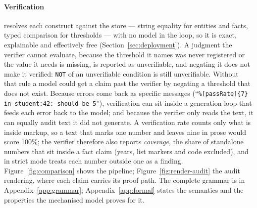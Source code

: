 \documentclass[11pt,a4paper]{article}
\begin{document}
\paragraph{Verification} resolves each construct against the store --- string equality for entities and facts, typed comparison for thresholds --- with no model in the loop, so it is exact, explainable and effectively free (Section~\ref{sec:deployment}). A judgment the verifier cannot evaluate, because the threshold it names was never registered or the value it needs is missing, is reported as unverifiable, and negating it does not make it verified: \texttt{NOT} of an unverifiable condition is still unverifiable. Without that rule a model could get a claim past the verifier by negating a threshold that does not exist. Because errors come back as specific messages (``\texttt{\%[passRate]\{7\} in student:42: should be 5}''), verification can sit inside a generation loop that feeds each error back to the model; and because the verifier only reads the text, it can equally audit text it did not generate. A verification rate counts only what is inside markup, so a text that marks one number and leaves nine in prose would score 100\%; the verifier therefore also reports \textit{coverage}, the share of standalone numbers that sit inside a fact claim (years, list markers and code excluded), and in strict mode treats each number outside one as a finding. Figure~\ref{fig:comparison} shows the pipeline; Figure~\ref{fig:render-audit} the audit rendering, where each claim carries its proof path. The complete grammar is in Appendix~\ref{app:grammar}; Appendix~\ref{app:formal} states the semantics and the properties the mechanised model proves for it.
\end{document}
